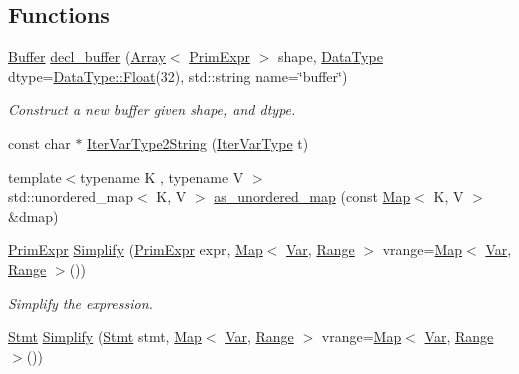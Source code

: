 \subsection*{Functions}
\begin{DoxyCompactItemize}
\item 
\hyperlink{classtvm_1_1tir_1_1Buffer}{Buffer} \hyperlink{namespacetvm_1_1tir_a9b3692f3f081d3b5b84a24cf8082141e}{decl\+\_\+buffer} (\hyperlink{classtvm_1_1Array}{Array}$<$ \hyperlink{classtvm_1_1PrimExpr}{Prim\+Expr} $>$ shape, \hyperlink{namespacetvm_a41918af1a1dc386388639a9d3ad06c5d}{Data\+Type} dtype=\hyperlink{classtvm_1_1runtime_1_1DataType_a237a714a6a16e14aa01fa4ac52426551}{Data\+Type\+::\+Float}(32), std\+::string name=\char`\"{}buffer\char`\"{})
\begin{DoxyCompactList}\small\item\em Construct a new buffer given shape, and dtype. \end{DoxyCompactList}\item 
const char $\ast$ \hyperlink{namespacetvm_1_1tir_afc0fdee9fc81462318d59dbe64c8df26}{Iter\+Var\+Type2\+String} (\hyperlink{namespacetvm_1_1tir_add7d0a6b1dd91f0c3c5dd2f4cf64358e}{Iter\+Var\+Type} t)
\item 
{\footnotesize template$<$typename K , typename V $>$ }\\std\+::unordered\+\_\+map$<$ K, V $>$ \hyperlink{namespacetvm_1_1tir_abb777c4f4d61883c0cbdf9116458b70d}{as\+\_\+unordered\+\_\+map} (const \hyperlink{classtvm_1_1Map}{Map}$<$ K, V $>$ \&dmap)
\item 
\hyperlink{classtvm_1_1PrimExpr}{Prim\+Expr} \hyperlink{namespacetvm_1_1tir_a923d1bb833c984008772782e90cda37a}{Simplify} (\hyperlink{classtvm_1_1PrimExpr}{Prim\+Expr} expr, \hyperlink{classtvm_1_1Map}{Map}$<$ \hyperlink{classtvm_1_1tir_1_1Var}{Var}, \hyperlink{classtvm_1_1Range}{Range} $>$ vrange=\hyperlink{classtvm_1_1Map}{Map}$<$ \hyperlink{classtvm_1_1tir_1_1Var}{Var}, \hyperlink{classtvm_1_1Range}{Range} $>$())
\begin{DoxyCompactList}\small\item\em Simplify the expression. \end{DoxyCompactList}\item 
\hyperlink{classtvm_1_1tir_1_1Stmt}{Stmt} \hyperlink{namespacetvm_1_1tir_a49287db98b766f8900dbbfcc466cb596}{Simplify} (\hyperlink{classtvm_1_1tir_1_1Stmt}{Stmt} stmt, \hyperlink{classtvm_1_1Map}{Map}$<$ \hyperlink{classtvm_1_1tir_1_1Var}{Var}, \hyperlink{classtvm_1_1Range}{Range} $>$ vrange=\hyperlink{classtvm_1_1Map}{Map}$<$ \hyperlink{classtvm_1_1tir_1_1Var}{Var}, \hyperlink{classtvm_1_1Range}{Range} $>$())

\end{DoxyCompactItemize}
